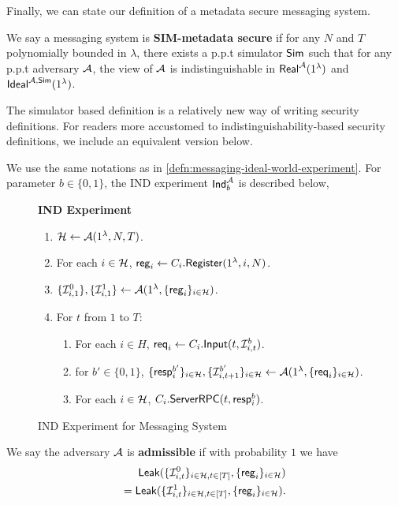 Finally, we can state our definition of a metadata secure messaging system.

\begin{definition}
\label{defn:messaging-security}
We say a messaging system is \textbf{SIM-metadata secure} if for any $N$ and $T$ polynomially bounded in $\lambda$, there exists a p.p.t simulator $\mathsf{Sim}$ such that for any p.p.t adversary $\mathcal{A}$, the view of $\mathcal{A}$ is indistinguishable in $\mathsf{Real}^{\mathcal{A}}(1^{\lambda})$ and $\mathsf{Ideal}^{\mathcal{A}, \mathsf{\mathsf{Sim}}}(1^{\lambda})$.
\end{definition}

The simulator based definition is a relatively new way of writing security definitions. For readers more accustomed to indistinguishability-based security definitions, we include an equivalent version below.
\begin{definition}
\label{defn:messaging-ind-experiment}
We use the same notations as in \cref{defn:messaging-ideal-world-experiment}. For parameter $b \in \{0, 1\}$, the IND experiment $\mathsf{Ind}_b^{\mathcal{A}}$ is described below, 
\begin{figure}[!h]
\begin{framed}
\textbf{IND Experiment}
\begin{enumerate}
\item $\mathcal{H} \leftarrow \mathcal{A}(1^{\lambda}, N, T)$.
\item For each $i \in \mathcal{H}$, $\mathsf{reg}_i \leftarrow C_i.\mathsf{Register}(1^{\lambda}, i, N)$. 
\item $\{\mathcal{I}^{0}_{i, 1}\}, \{\mathcal{I}^{1}_{i, 1}\} \leftarrow \mathcal{A}(1^{\lambda}, \{\mathsf{reg}_i\}_{i \in \mathcal{H}})$.
\item For $t$ from $1$ to $T$:
    \begin{enumerate}
    \item For each $i \in H$, $\mathsf{req}_i \leftarrow C_i.\mathsf{Input}(t, \mathcal{I}^{b}_{i, t})$.
    
    \item for $b'\in \{0, 1\}$, $\{\mathsf{resp}^{b'}_i\}_{i \in \mathcal{H}},\{\mathcal{I}^{b'}_{i, t + 1}\}_{i \in \mathcal{H}} \leftarrow \mathcal{A}(1^{\lambda}, \{\mathsf{req}_i\}_{i \in \mathcal{H}})$.
    
    \item For each $i \in \mathcal{H}$, $C_i.\mathsf{ServerRPC}(t, \mathsf{resp}^{b}_i)$.
    \end{enumerate}
\end{enumerate}
\end{framed}
\caption{IND Experiment for Messaging System}
\label{expr:messaging-IND}
\end{figure}

We say the adversary $\mathcal{A}$ is \textbf{admissible} if with probability $1$ we have
\begin{align*}
\mathsf{Leak}(\{\mathcal{I}^{0}_{i, t}\}_{i \in \mathcal{H}, t \in [T]}, \{\mathsf{reg}_i\}_{i \in \mathcal{H}}) \\
= \mathsf{Leak}(\{\mathcal{I}^{1}_{i, t}\}_{i \in \mathcal{H}, t \in [T]}, \{\mathsf{reg}_i\}_{i \in \mathcal{H}}).    
\end{align*}
\end{definition}

